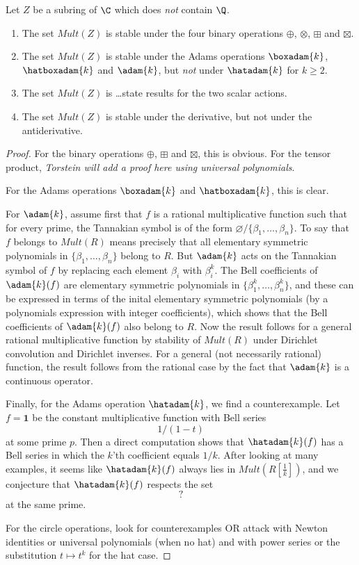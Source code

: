 \begin{theorem}
Let $Z$ be a subring of $\C$ which does \emph{not} contain $\Q$.
\begin{enumerate}
\item The set $Mult(Z)$ is stable under the four binary operations $\oplus$, $\otimes$, $\boxplus$ and $\boxtimes$.
\item The set $Mult(Z)$ is stable under the Adams operations $\boxadam{k}$, $\hatboxadam{k}$ and $\adam{k}$, but \emph{not} under $\hatadam{k}$ for $k \geq 2$. 
\item The set $Mult(Z)$ is \ldots state results for the two scalar actions.
\item The set $Mult(Z)$ is stable under the derivative, but not under the antiderivative.
\end{enumerate}
\end{theorem}

\begin{proof}
For the binary operations $\oplus$, $\boxplus$ and $\boxtimes$, this is obvious. For the tensor product, \emph{Torstein will add a proof here using universal polynomials}. 

For the Adams operations $\boxadam{k}$ and $\hatboxadam{k}$, this is clear. 

For $\adam{k}$, assume first that $f$ is a rational multiplicative function such that for every prime, the Tannakian symbol is of the form $ \varnothing / \{ \beta_1, \ldots, \beta_n  \}$. To say that $f$ belongs to $Mult(R)$ means precisely that all elementary symmetric polynomials in $\{ \beta_1, \ldots, \beta_n  \}$ belong to $R$. But $\adam{k}$ acts on the Tannakian symbol of $f$ by replacing each element $\beta_i$ with $\beta_i^k$. The Bell coefficients of $\adam{k}(f)$ are elementary symmetric polynomials in $\{ \beta_1^k, \ldots, \beta_n^k  \}$, and these can be expressed in terms of the inital elementary symmetric polynomials (by a polynomials expression with integer coefficients), which shows that the Bell coefficients of $\adam{k}(f)$ also belong to $R$. 
Now the result follows for a general rational multiplicative function by stability of $Mult(R)$ under Dirichlet convolution and Dirichlet inverses. For a general (not necessarily rational) function, the result follows from the rational case by the fact that $\adam{k}$ is a continuous operator.

Finally, for the Adams operation $\hatadam{k}$, we find a counterexample. Let $f = \mathbf{1}$ be the constant multiplicative function with Bell series
$$  1 / (1-t) $$
at some prime $p$. Then a direct computation shows that $\hatadam{k}(f)$ has a Bell series in which the $k$'th coefficient equals $1/k$. After looking at many examples, it seems like $\hatadam{k}(f)$ always lies in $Mult(R [\frac{1}{k}])$, and we conjecture that $\hatadam{k}(f)$ respects the set 
$$   ? $$
at the same prime.


For the circle operations, look for counterexamples OR attack with Newton identities or universal polynomials (when no hat) and with power series or the substitution $t \mapsto t^k$ for the hat case.


\end{proof}

